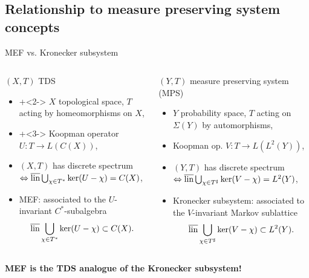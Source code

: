 \subsection{Relationship to measure preserving system concepts}
\begin{frame}{MEF vs. Kronecker subsystem}
  \begin{columns}[t]
    \begin{column}{0.5\textwidth}
      $(X,T)$ TDS
      \begin{itemize}
              \item \onslide+<2->
$X$ topological space, $T$ acting by homeomorphisms on $X$,
        \item \onslide+<3-> Koopman operator $U : T \to L(C(X))$,
        \item $(X,T)$ has discrete spectrum $\Leftrightarrow \overline{\operatorname{lin}} \bigcup_{\chi \in T^*} \ker (U- \chi) = C(X)$,
        \item {} MEF: associated to the $U$-invariant $C^*$-subalgebra
          \begin{equation*}
            \overline{\operatorname{lin}} \bigcup_{\chi \in T^*} \ker (U- \chi)  \subset C(X).
          \end{equation*}
      \end{itemize}
    \end{column}
\begin{column}{0.5\textwidth}
  $(Y,T)$ measure preserving system (MPS)
  \begin{itemize}
    \item $Y$ probability space, $T$ acting on $\Sigma (Y)$ by automorphisms,
    \item {} Koopman op. $V: T \to L(L^2(Y))$,
    \item $(Y,T)$ has discrete spectrum $\Leftrightarrow \overline{\operatorname{lin}} \bigcup_{\chi \in T^\sharp} \ker (V- \chi) = L^2(Y)$,
    \item {} Kronecker subsystem: associated to the $V$-invariant Markov sublattice 
      \begin{equation*}
        \overline{\operatorname{lin}} \bigcup_{\chi \in T^\sharp} \ker (V- \chi)  \subset L^2(Y).
      \end{equation*}
  \end{itemize}
    \end{column}
  \end{columns}
  \centering
  \textbf{MEF is the TDS analogue of the Kronecker subsystem!}
\end{frame}
